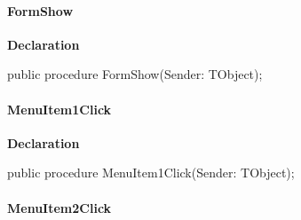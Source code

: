 \documentclass{report}
\newif\ifpdf
\begin{document}
\paragraph*{FormShow}\hspace*{\fill}

\label{mnupdate.TUMnForm-FormShow}
\begin{list}{}{
\setlength{\itemindent}{0cm}
\setlength{\listparindent}{0cm}
\setlength{\leftmargin}{\evensidemargin}
\addtolength{\leftmargin}{\tmplength}
\settowidth{\labelsep}{X}
\addtolength{\leftmargin}{\labelsep}
\setlength{\labelwidth}{\tmplength}
}
\item[\textbf{Declaration}\hfill]
\ifpdf
\begin{flushleft}
\fi
\begin{ttfamily}
public procedure FormShow(Sender: TObject);\end{ttfamily}

\ifpdf
\end{flushleft}
\fi

\end{list}
\paragraph*{MenuItem1Click}\hspace*{\fill}

\label{mnupdate.TUMnForm-MenuItem1Click}
\begin{list}{}{
\setlength{\itemindent}{0cm}
\setlength{\listparindent}{0cm}
\setlength{\leftmargin}{\evensidemargin}
\addtolength{\leftmargin}{\tmplength}
\settowidth{\labelsep}{X}
\addtolength{\leftmargin}{\labelsep}
\setlength{\labelwidth}{\tmplength}
}
\item[\textbf{Declaration}\hfill]
\ifpdf
\begin{flushleft}
\fi
\begin{ttfamily}
public procedure MenuItem1Click(Sender: TObject);\end{ttfamily}

\ifpdf
\end{flushleft}
\fi

\end{list}
\paragraph*{MenuItem2Click}\hspace*{\fill}
\end{document}
